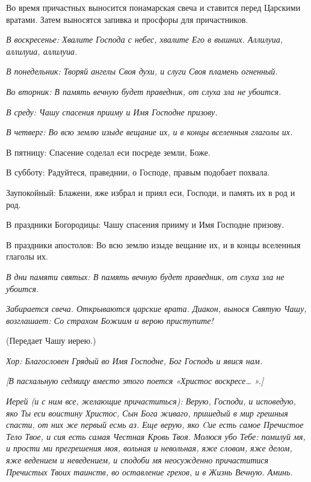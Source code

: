 

      Во время причастных выносится понамарская свеча и ставится перед Царскими вратами. Затем выносятся запивка и просфоры для причастников.


\itshape  В воскресенье:\normalfont{} Хвалите Господа с небес, хвалите Его в вышних. Аллилуиа, аллилуиа, аллилуиа. 


\itshape В понедельник:\normalfont{} Творяй ангелы Своя духи, и слуги Своя пламень огненный. 


\itshape Во вторник:\normalfont{} В память вечную будет праведник, от слуха зла не убоится. 


\itshape В среду:\normalfont{} Чашу спасения прииму и Имя Господне призову. 


\itshape В четверг:\normalfont{} Во всю землю изыде вещание их, и в концы вселенныя глаголы их. \itshape 


  В пятницу:\normalfont{} Спасение соделал еси посреде земли, Боже. \itshape 


  В субботу:\normalfont{} Радуйтеся, праведнии, о Господе, правым подобает похвала. \itshape 


  Заупокойный:\normalfont{} Блажени, яже избрал и приял еси, Господи, и память их в род и род. \itshape 


  В праздники Богородицы:\normalfont{} Чашу спасения прииму и Имя Господне призову. \itshape 


  В праздники апостолов:\normalfont{} Во всю землю изыде вещание их, и в концы вселенныя глаголы их. 


\itshape В дни памяти святых:\normalfont{} В память вечную будет праведник, от слуха зла не убоится. 


\itshape   Забирается свеча\normalfont{}. \itshape  Открываются царские врата. Диакон, вынося Святую Чашу, возглашает: Со страхом Божиим и верою приступите! 


  (Передает Чашу иерею.) \normalfont{}


\itshape Хор:\normalfont{} Благословен Грядый во Имя Господне, Бог Господь и явися нам.


\itshape [В пасхальную седмицу вместо этого поется «Христос воскресе… ».]\normalfont{}


\itshape  Иерей (и с ним все, желающие причаститься):\normalfont{} Верую, Господи, и исповедую, яко Ты еси воистину Христос, Сын Бога живаго, пришедый в мир грешныя спасти, от них же первый есмь аз. Еще верую, яко Cие есть самое Пречистое Тело Твое, и сия есть самая Честная Кровь Твоя. Молюся убо Тебе: помилуй мя, и прости ми прегрешения моя, вольная и невольная, яже словом, яже делом, яже ведением и неведением, и сподоби мя неосужденно причаститися Пречистых Твоих таинств, во оставление грехов, и в Жизнь Вечную. Аминь.



